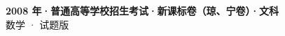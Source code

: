 \documentclass[zihao=-4, a4paper]{ctexart}
\begin{document}
\begin{center}
  {\Large\bfseries 2008 年·普通高等学校招生考试·新课标卷（琼、宁卷）·文科}\\[4pt]
  {\large 数学 · 试题版}
\end{center}
\medskip
{}

\end{document}
